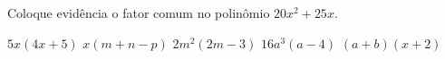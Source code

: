 Coloque evidência o fator comum no polinômio $20x^2+25x$.

$5x(4x+5)$
$x(m+n-p)$
$2m^2(2m-3)$
$16a^3(a-4)$
$(a+b)(x+2)$

